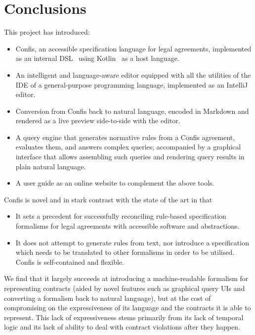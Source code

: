 \chapter{Conclusions}\label{ch:conclusions}



This project has introduced:
\begin{itemize}
    \item Confis, an accessible specification language for legal agreements, implemented as an internal DSL~\cite{fowlerDsl} using Kotlin~\cite{kotlinLang} as a host language.
    \item An intelligent and language-aware editor equipped with all the utilities of the IDE of a general-purpose programming language, implemented as an IntelliJ~\cite{intelliJRepo} editor.
    \item Conversion from Confis back to natural language, encoded in Markdown and rendered as a live preview side-to-side with the editor.
    \item A query engine that generates normative rules from a Confis agreement, evaluates them, and answers complex queries;
    accompanied by a graphical interface that allows assembling such queries and rendering query results in plain natural language.
    \item A user guide as an online website to complement the above tools.
\end{itemize}

Confis is novel and in stark contrast with the state of the art in that
\begin{itemize}
    \item It sets a precedent for successfully reconciling rule-based specification formalisms for legal agreements with accessible software and abstractions.
    \item It does not attempt to generate rules from text, nor introduce a specification which needs to be translated to other formalisms in order to be utilised.
    Confis is self-contained and flexible.
\end{itemize}

We find that it largely succeeds at introducing a machine-readable formalism for representing contracts (aided by novel features such as graphical query UIs and converting a formalism back to natural language), but at the cost of compromising on the expressiveness of its language and the contracts it is able to represent.
This lack of expressiveness stems primarily from its lack of temporal logic and its lack of ability to deal with contract violations after they happen.


